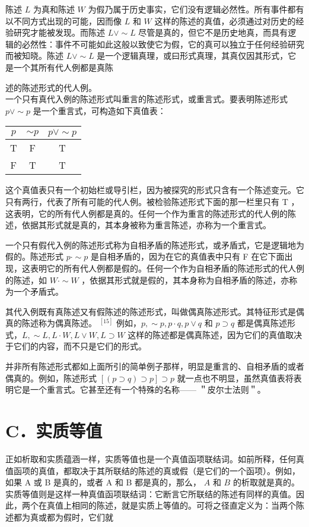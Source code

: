 陈述 $L$ 为真和陈述 $W$ 为假乃属于历史事实，它们没有逻辑必然性。所有事件都有以不同方式出现的可能，因而像 $L$ 和 $W$ 这样的陈述的真值，必须通过对历史的经验研究才能被发现。而陈述 $L \vee \sim L$ 尽管是真的，但它不是历史地真，而具有逻辑的必然性：事件不可能如此这般以致使它为假，它的真可以独立于任何经验研究而被知晓。陈述 $L \vee \sim L$ 是一个逻辑真理，或曰形式真理，其真仅因其形式，它是一个其所有代人例都是真陈

述的陈述形式的代人例。\\
一个只有真代入例的陈述形式叫重言的陈述形式，或重言式。要表明陈述形式 $p \vee \sim p$ 是一个重言式，可构造如下真值表：

\begin{center}
\begin{tabular}{|ccc|}
\hline
$p$ & $\sim p$ & $p \vee \sim p$ \\
\hline
T & F & T \\
F & T & T \\
\hline
\end{tabular}
\end{center}

这个真值表只有一个初始栏或导引栏，因为被探究的形式只含有一个陈述变元。它只有两行，代表了所有可能的代人例。被检验陈述形式下面的那一栏里只有 T ，这表明，它的所有代人例都是真的。任何一个作为重言的陈述形式的代人例的陈述，依据其形式就是真的，其本身被称为重言陈述，亦称为一个重言式。

一个只有假代入例的陈述形式称为自相矛盾的陈述形式，或矛盾式，它是逻辑地为假的。陈述形式 $p \cdot \sim p$ 是自相矛盾的，因为在它的真值表中只有 F 在它下面出现，这表明它的所有代人例都是假的。任何一个作为自相矛盾的陈述形式的代人例的陈述，如 $W \cdot \sim W$ ，依据其形式就是假的，其本身称为自相矛盾的陈述，亦称为一个矛盾式。

其代入例既有真陈述又有假陈述的陈述形式，叫做偶真陈述形式。其特征形式是偶真的陈述称为偶真陈述。 ${ }^{[15]}$ 例如，$p, \sim p, p \cdot q, p \vee q$ 和 $p \supset q$ 都是偶真陈述形式，$L, \sim L, L \cdot W, L \vee W, L \supset W$ 这样的陈述都是偶真陈述，因为它们的真值取决于它们的内容，而不只是它们的形式。

并非所有陈述形式都如上面所引的简单例子那样，明显是重言的、自相矛盾的或者偶真的。例如，陈述形式 $[(p \supset q) \supset p] \supset p$ 就一点也不明显，虽然真值表将表明它是一个重言式。它甚至还有一个特殊的名称—— ＂皮尔士法则＂。

\section*{C．实质等值}
正如析取和实质蕴涵一样，实质等值也是一个真值函项联结词。如前所释，任何真值函项的真值，都取决于其所联结的陈述的真或假（是它们的一个函项）。例如，如果 A 或 B 是真的，或者 A 和 B 都是真的，那么， $A$ 和 $B$ 的析取就是真的。实质等值则是这样一种真值函项联结词：它断言它所联结的陈述有同样的真值。因此，两个在真值上相同的陈述，就是实质上等值的。可将之径直定义为：当两个陈述都为真或都为假时，它们就


